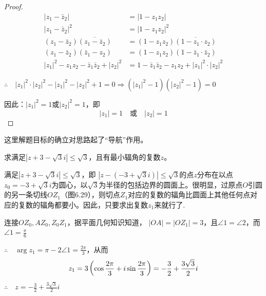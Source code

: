 \begin{proof}
\[\begin{split}
    |z_1-\bar z_2|&=|1-z_1z_2|\\
     |z_1-\bar z_2|^2&=|1-z_1z_2|^2\\
(z_1-\bar z_2)\overline{(z_1-\bar z_2)}&=(1-z_1z_2)\overline{(1-z_1\cdot z_2)}   \\
 (z_1-\bar z_2)(\bar z_1-z_2)&=(1-z_1z_2)(1-\bar z_1\cdot \bar z_2)     \\
     |z_1|^2-z_1z_2-\bar z_1\bar z_2 +|z_2|^2&=1-\bar z_1\bar z_2-z_1z_2+|z_1|^2\cdot |z_2|^2     
\end{split}\]

$\therefore\quad |z_1|^2\cdot |z_2|^2-|z_1|^2- |z_2|^2+1=0 \Rightarrow (|z_1|^2-1)(|z_2|^2-1)=0$

因此：$|z_1|^2=1$或$|z_2|^2=1$，即
\[|z_1|=1\quad\text{或}\quad |z_2|=1\]
\end{proof}

\begin{rmk}
    这里解题目标的确立对思路起了“导航”作用。
\end{rmk}

\begin{example}
    求满足$|z+3-\sqrt{3}i|\le \sqrt{3}$，且有最小辐角的复数$z$。
\end{example}

\begin{solution}
    满足$|z+3-\sqrt{3}i|\le \sqrt{3}$，即
$\left|z-(-3+\sqrt{3}i)\right|\le \sqrt{3}$的点$z$分布在以点$z_0=-3+\sqrt{3}i$为圆心，以$\sqrt{3}$为半径的包括边界的圆面上。很明显，过原点$O$引圆的另一条切线$OZ_1$（图6.29），则切点$Z_1$对应的复数的辐角比圆面上其他任何点对应的复数的辐角都要小。因此，只要求出复数$z_1$来就行了.

\noindent
\begin{minipage}{.55\textwidth}
\CTEXindent  连接$OZ_0,AZ_0,Z_0Z_1$，据平面几何知识知道，
$|OA|=|OZ_1|=3$，且$\angle 1=\angle 2$，而$\angle 1=\frac{\pi}{6}$

$\therefore\quad \arg z_1=\pi-2\angle 1=\frac{2\pi}{3}$，从而
\[z_1=3\left(\cos\dfrac{2\pi}{3}+i\sin\dfrac{2\pi}{3}\right)=-\dfrac{3}{2}+\dfrac{3\sqrt{3}}{2}i\]
$\therefore\quad z=-\frac{3}{2}+\frac{3\sqrt{3}}{2}i$    
\end{minipage}\hfill
\begin{minipage}{.4\textwidth}
\centering
{}
\end{minipage}
\end{solution}

